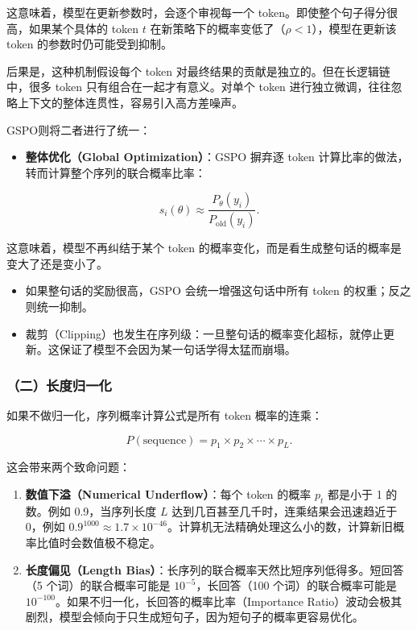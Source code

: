 这意味着，模型在更新参数时，会逐个审视每一个 token。即使整个句子得分很高，如果某个具体的 token \(t\) 在新策略下的概率变低了（\(\rho<1\)），模型在更新该 token 的参数时仍可能受到抑制。

后果是，这种机制假设每个 token 对最终结果的贡献是独立的。但在长逻辑链中，很多 token 只有组合在一起才有意义。对单个 token 进行独立微调，往往忽略上下文的整体连贯性，容易引入高方差噪声。

GSPO则将二者进行了统一：

\begin{itemize}
\tightlist
\item
  \textbf{整体优化（Global Optimization）}：GSPO 摒弃逐 token 计算比率的做法，转而计算整个序列的联合概率比率：
\end{itemize}

\[
s_i(\theta)
\approx
\frac{P_\theta(y_i)}
{P_{\mathrm{old}}(y_i)}.
\]

这意味着，模型不再纠结于某个 token 的概率变化，而是看生成整句话的概率是变大了还是变小了。

\begin{itemize}
\tightlist
\item
  如果整句话的奖励很高，GSPO 会统一增强这句话中所有 token 的权重；反之则统一抑制。
\item
  裁剪（Clipping）也发生在序列级：一旦整句话的概率变化超标，就停止更新。这保证了模型不会因为某一句话学得太猛而崩塌。
\end{itemize}

\hypertarget{ux4e8cux957fux5ea6ux5f52ux4e00ux5316}{%
\subsubsection{（二）长度归一化}\label{ux4e8cux957fux5ea6ux5f52ux4e00ux5316}}

如果不做归一化，序列概率计算公式是所有 token 概率的连乘：

\[
P(\mathrm{sequence})
=
p_1\times p_2\times\cdots\times p_L.
\]

这会带来两个致命问题：

\begin{enumerate}
\def\labelenumi{\arabic{enumi}.}
\tightlist
\item
  \textbf{数值下溢（Numerical Underflow）}：每个 token 的概率 \(p_t\) 都是小于 1 的数。例如 0.9，当序列长度 \(L\) 达到几百甚至几千时，连乘结果会迅速趋近于 0，例如 \(0.9^{1000}\approx 1.7\times 10^{-46}\)。计算机无法精确处理这么小的数，计算新旧概率比值时会数值极不稳定。
\item
  \textbf{长度偏见（Length Bias）}：长序列的联合概率天然比短序列低得多。短回答（5 个词）的联合概率可能是 \(10^{-5}\)，长回答（100 个词）的联合概率可能是 \(10^{-100}\)。如果不归一化，长回答的概率比率（Importance Ratio）波动会极其剧烈，模型会倾向于只生成短句子，因为短句子的概率更容易优化。
\end{enumerate}

